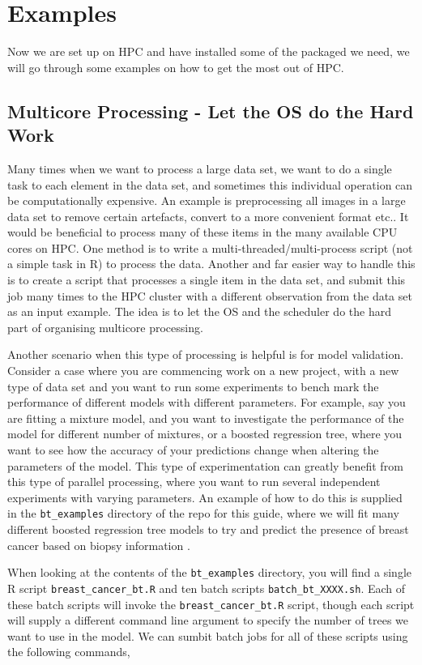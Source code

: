 \section{Examples}
Now we are set up on HPC and have installed some of the packaged we need, we will go through some examples on how to get the most out of HPC.
%
%
%
\subsection{Multicore Processing - Let the OS do the Hard Work}
%
%
Many times when we want to process a large data set, we want to do a single task to each element in the data set, and sometimes this individual operation can be computationally expensive. An example is preprocessing all images in a large data set to remove certain artefacts, convert to a more convenient format etc.. It would be beneficial to process many of these items in the many available CPU cores on HPC. One method is to write a multi-threaded/multi-process script (not a simple task in R) to process the data. Another and far easier way to handle this is to create a script that processes a single item in the data set, and submit this job many times to the HPC cluster with a different observation from the data set as an input example. The idea is to let the OS and the scheduler do the hard part of organising multicore processing.
%
%
%
\par
%
%
Another scenario when this type of processing is helpful is for model validation. Consider a case where you are commencing work on a new project, with a new type of data set and you want to run some experiments to bench mark the performance of different models with different parameters. For example, say you are fitting a mixture model, and you want to investigate the performance of the model for different number of mixtures, or a boosted regression tree, where you want to see how the accuracy of your predictions change when altering the parameters of the model. This type of experimentation can greatly benefit from this type of parallel processing, where you want to run several independent experiments with varying parameters. An example of how to do this is supplied in the \texttt{bt\_examples} directory of the repo for this guide, where we will fit many different boosted regression tree models to try and predict the presence of breast cancer based on biopsy information \cite{breast}.
%
%
%
\par
%
%
When looking at the contents of the \texttt{bt\_examples} directory, you will find a single R script \texttt{breast\_cancer\_bt.R} and ten batch scripts \texttt{batch\_bt\_XXXX.sh}. Each of these batch scripts will invoke the \texttt{breast\_cancer\_bt.R} script, though each script will supply a different command line argument to specify the number of trees we want to use in the model. We can sumbit batch jobs for all of these scripts using the following commands,
